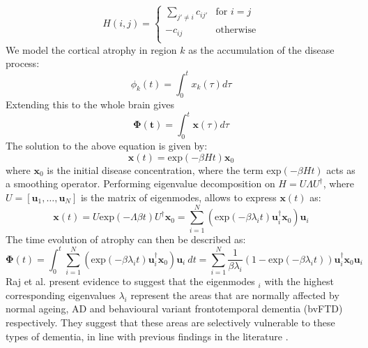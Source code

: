 \begin{equation}
\label{eq:raj3}
 H(i,j) = \begin{cases} 
 \sum_{j' \neq i} c_{ij'} & \mbox{for } i = j \\ 
 -c_{ij} & \mbox{otherwise} \\ 
\end{cases} 
\end{equation}
We model the cortical atrophy in region $k$ as the accumulation of the disease process:
\begin{equation}
\label{eq:raj4}
 \phi_k(t) = \int_0^t x_k(\tau)d\tau
\end{equation}
Extending this to the whole brain gives 
\begin{equation}
 \boldsymbol{\Phi(t)} = \int_0^t \textbf{x}(\tau)d\tau
\end{equation}
The solution to the above equation is given by:
\begin{equation}
 \textbf{x}(t) = \text{exp}(-\beta H t) \textbf{x}_0
\end{equation}
where $\textbf{x}_0$ is the initial disease concentration, where the term $\text{exp}(-\beta H t)$ acts as a smoothing operator. Performing eigenvalue decomposition on $H = U\Lambda U^{\dagger}$, where $U = [\textbf{u}_1,\dots,\textbf{u}_N]$ is the matrix of eigenmodes, allows to express $\textbf{x}(t)$ as:
\begin{equation}
 \textbf{x}(t) = U \text{exp}(-\Lambda \beta t) U^{\dagger} \textbf{x}_0 = \sum_{i=1}^N \left( \text{exp}(-\beta \lambda_i t) \textbf{u}_i^{\dagger} \textbf{x}_0 \right) \textbf{u}_i
\end{equation}
The time evolution of atrophy can then be described as:
\begin{equation} 
 \boldsymbol{\Phi}(t) = \int_0^t \sum_{i=1}^N \left( \text{exp}(-\beta \lambda_i t) \textbf{u}_i^{\dagger} \textbf{x}_0 \right) \textbf{u}_i\ dt = \sum_{i=1}^N \frac{1}{\beta \lambda_i} \left( 1-\text{exp}(-\beta \lambda_i t)\right) \textbf{u}_i^{\dagger} \textbf{x}_0 \textbf{u}_i 
\end{equation}
Raj et al. \cite{raj2012network} present evidence to suggest that the eigenmodes $\textbf{}_i$ with the highest corresponding eigenvalues $\lambda_i$ represent the areas that are normally affected by normal ageing, AD and behavioural variant frontotemporal dementia (bvFTD) respectively. They suggest that these areas are selectively vulnerable to these types of dementia, in line with previous findings in the literature \cite{seeley2009neurodegenerative,zhou2010divergent}. 

